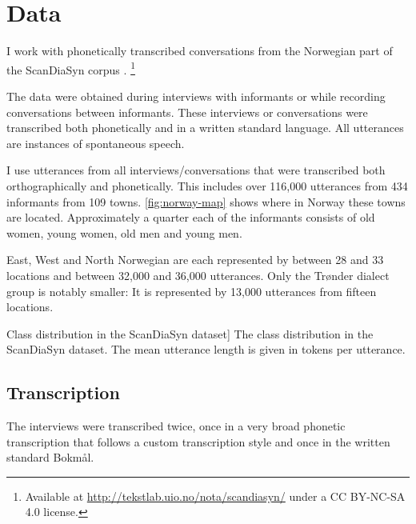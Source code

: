 \section{Data}
\label{sec:dialects-data}

I work with phonetically transcribed conversations from the Norwegian part of the ScanDiaSyn corpus \citep{johannessen2009nordic}.%
\footnote{Available at \url{http://tekstlab.uio.no/nota/scandiasyn/} under a CC BY-NC-SA 4.0 license.}

The data were obtained during interviews with informants or while recording conversations between informants.
These interviews or conversations were transcribed both phonetically and in a written standard language.
All utterances are instances of spontaneous speech.


I use utterances from all interviews/conversations that were transcribed both orthographically and phonetically.
This includes over 116,000 utterances from 434 informants from 109 towns.
\autoref{fig:norway-map} shows where in Norway these towns are located.
Approximately a quarter each of the informants consists of old women, young women, old men and young men. 

East, West and North Norwegian are each represented by between 28 and 33 locations and between 32,000 and 36,000 utterances.
Only the Trønder dialect group is notably smaller: It is represented by 13,000 utterances from fifteen locations.

\begin{table}[ht]

\caption
[Class distribution in the ScanDiaSyn dataset]
{The class distribution in the ScanDiaSyn dataset.
The mean utterance length is given in tokens per utterance.}
\label{tab:scandiasyn}
\end{table}


\subsection{Transcription}

The interviews were transcribed twice, once in a very broad phonetic transcription that follows a  custom transcription style and once in the written standard Bokm{\aa}l.


